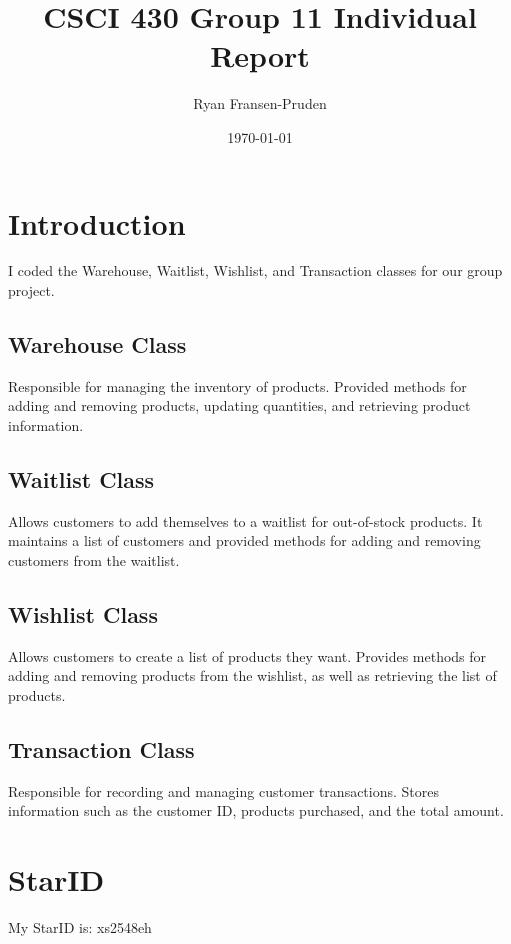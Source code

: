 \documentclass[11pt]{article}
\title{CSCI 430 Group 11 Individual Report}
\author{Ryan Fransen-Pruden}
\date{\today}
\begin{document}
\maketitle

\section*{Introduction}
I coded the Warehouse, Waitlist, Wishlist, and Transaction classes for our group project.

\subsection*{Warehouse Class}
Responsible for managing the inventory of products. Provided methods for adding and removing products, updating quantities, and retrieving product information.

\subsection*{Waitlist Class}
Allows customers to add themselves to a waitlist for out-of-stock products. It maintains a list of customers and provided methods for adding and removing customers from the waitlist.

\subsection*{Wishlist Class}
Allows customers to create a list of products they want. Provides methods for adding and removing products from the wishlist, as well as retrieving the list of products.

\subsection*{Transaction Class}
Responsible for recording and managing customer transactions. Stores information such as the customer ID, products purchased, and the total amount.

\section*{StarID}
My StarID is: xs2548eh
\end{document}
